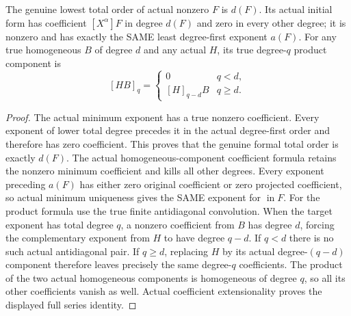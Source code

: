 \begin{lemma}
\label{hir:actual-homogeneous-initial-form-coefficients}
The genuine lowest total order of actual nonzero $F$ is $d(F)$.
Its actual initial form has coefficient $[X^\alpha]F$ in degree $d(F)$
and zero in every other degree; it is nonzero and has exactly the SAME
least degree-first exponent $a(F)$.
For any true homogeneous $B$ of degree $d$ and any actual $H$, its
true degree-$q$ product component is
\[
 [HB]_q=\begin{cases}0&q<d,\\{}[H]_{q-d}B&q\ge d.\end{cases}
\]
\leanok
\end{lemma}
\begin{proof}
The actual minimum exponent has a true nonzero coefficient. Every
exponent of lower total degree precedes it in the actual degree-first
order and therefore has zero coefficient. This proves that the genuine
formal total order is exactly $d(F)$. The actual homogeneous-component
coefficient formula retains the nonzero minimum coefficient and kills
all other degrees. Every exponent preceding $a(F)$ has either zero
original coefficient or zero projected coefficient, so actual minimum
uniqueness gives the SAME exponent for $\operatorname{in}F$.
For the product formula use the true finite antidiagonal convolution.
When the target exponent has total degree $q$, a nonzero coefficient
from $B$ has degree $d$, forcing the complementary exponent from $H$
to have degree $q-d$. If $q<d$ there is no such actual antidiagonal
pair. If $q\ge d$, replacing $H$ by its actual degree-$(q-d)$
component therefore leaves precisely the same degree-$q$ coefficients.
The product of the two actual homogeneous components is homogeneous
of degree $q$, so all its other coefficients vanish as well. Actual
coefficient extensionality proves the displayed full series identity.
\end{proof}

